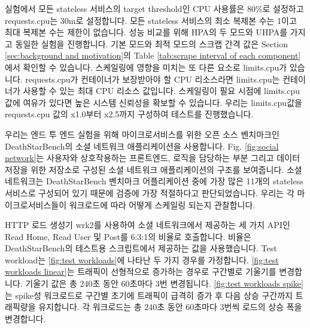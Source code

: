 \documentclass[conference]{IEEEtran}
\begin{document}
실험에서 모든 stateless 서비스의 target threshold인 CPU 사용률은 80\%로 설정하고 requests.cpu는 30m로 설정합니다. 모든 stateless 서비스의 최소 복제본 수는 1이고 최대 복제본 수는 제한이 없습니다. 성능 비교를 위해 HPA의 두 모드와 UHPA를 가지고 동일한 실험을 진행합니다. 기본 모드와 최적 모드의 스크랩 간격 값은 Section \ref{sec:background and motivation}의 Table \ref{tab:scrape interval of each component} 에서 확인할 수 있습니다. 스케일링에 영향을 미치는 또 다른 요소로 limits.cpu가 있습니다. requests.cpu가 컨테이너가 보장받아야 할 CPU 리소스라면 limits.cpu는 컨테이너가 사용할 수 있는 최대 CPU 리소스 값입니다. 스케일링이 필요 시점에 limits.cpu값에 여유가 있다면 높은 시스템 신뢰성을 확보할 수 있습니다. 우리는 limits.cpu값을 requests.cpu 값의 x1.0부터 x2.5까지 구성하여 테스트를 진행했습니다.

우리는 엔드 투 엔드 실험을 위해 마이크로서비스를 위한 오픈 소스 벤치마크인 DeathStarBench\cite{DeathStarBench}의 소셜 네트워크 애플리케이션을 사용합니다. Fig. \ref{fig:social network}는 사용자와 상호작용하는 프론트엔드, 로직을 담당하는 부분 그리고 데이터 저장을 위한 저장소로 구성된 소셜 네트워크 애플리케이션의 구조를 보여줍니다. 소셜 네트워크는 DeathStarBench 벤치마크 어플리케이션 중에 가장 많은 11개의 stateless 서비스로 구성되어 있기 때문에 검증에 가장 적절하다고 판단되었습니다. 우리는 각 마이크로서비스들이 워크로드에 따라 어떻게 스케일링 되는지 관찰합니다.

HTTP 로드 생성기 wrk2\cite{wrk2}를 사용하여 소셜 네트워크에서 제공하는 세 가지 API인 Read Home, Read User 및 Post를 6:3:1의 비율로 호출합니다. 비율은 DeathStarBench의 테스트용 스크립트에서 제공하는 값을 사용했습니다. Test workload는 \ref{fig:test workloads}에 나타난 두 가지 경우를 가정합니다. \ref{fig:test workloads linear}는 트래픽이 선형적으로 증가하는 경우로 구간별로 기울기를 변경합니다. 기울기 값은 총 240초 동안 60초마다 3번 변경됩니다. \ref{fig:test workloads spike}는 spike성 워크로드로 구간별 초기에 트래픽이 급격히 증가 후 다음 상승 구간까지 트래픽량을 유지합니다. 각 워크로드는 총 240초 동안 60초마다 3번씩 로드의 상승 폭을 변경합니다.
\end{document}
